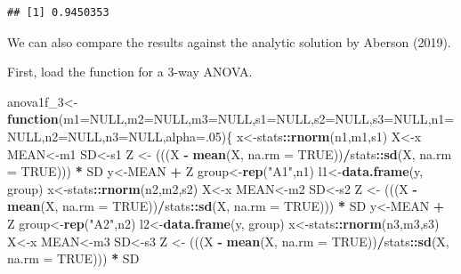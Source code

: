 \documentclass[]{book}
\newenvironment{Shaded}{\begin{snugshade}}{\end{snugshade}}
\newcommand{\ControlFlowTok}[1]{\textcolor[rgb]{0.13,0.29,0.53}{\textbf{#1}}}
\newcommand{\DataTypeTok}[1]{\textcolor[rgb]{0.13,0.29,0.53}{#1}}
\newcommand{\DecValTok}[1]{\textcolor[rgb]{0.00,0.00,0.81}{#1}}
\newcommand{\KeywordTok}[1]{\textcolor[rgb]{0.13,0.29,0.53}{\textbf{#1}}}
\newcommand{\NormalTok}[1]{#1}
\newcommand{\OperatorTok}[1]{\textcolor[rgb]{0.81,0.36,0.00}{\textbf{#1}}}
\newcommand{\OtherTok}[1]{\textcolor[rgb]{0.56,0.35,0.01}{#1}}
\newcommand{\StringTok}[1]{\textcolor[rgb]{0.31,0.60,0.02}{#1}}
\begin{document}
\begin{verbatim}
## [1] 0.9450353
\end{verbatim}

We can also compare the results against the analytic solution by Aberson (2019).

First, load the function for a 3-way ANOVA.

\begin{Shaded}
\begin{Highlighting}[]
\NormalTok{anova1f_}\DecValTok{3}\NormalTok{<-}\ControlFlowTok{function}\NormalTok{(}\DataTypeTok{m1=}\OtherTok{NULL}\NormalTok{,}\DataTypeTok{m2=}\OtherTok{NULL}\NormalTok{,}\DataTypeTok{m3=}\OtherTok{NULL}\NormalTok{,}\DataTypeTok{s1=}\OtherTok{NULL}\NormalTok{,}\DataTypeTok{s2=}\OtherTok{NULL}\NormalTok{,}\DataTypeTok{s3=}\OtherTok{NULL}\NormalTok{,}\DataTypeTok{n1=}\OtherTok{NULL}\NormalTok{,}\DataTypeTok{n2=}\OtherTok{NULL}\NormalTok{,}\DataTypeTok{n3=}\OtherTok{NULL}\NormalTok{,}\DataTypeTok{alpha=}\NormalTok{.}\DecValTok{05}\NormalTok{)\{}
\NormalTok{x<-stats}\OperatorTok{::}\KeywordTok{rnorm}\NormalTok{(n1,m1,s1)}
\NormalTok{X<-x}
\NormalTok{MEAN<-m1}
\NormalTok{SD<-s1}
\NormalTok{Z <-}\StringTok{ }\NormalTok{(((X }\OperatorTok{-}\StringTok{ }\KeywordTok{mean}\NormalTok{(X, }\DataTypeTok{na.rm =} \OtherTok{TRUE}\NormalTok{))}\OperatorTok{/}\NormalTok{stats}\OperatorTok{::}\KeywordTok{sd}\NormalTok{(X, }\DataTypeTok{na.rm =} \OtherTok{TRUE}\NormalTok{))) }\OperatorTok{*}\StringTok{ }\NormalTok{SD}
\NormalTok{y<-MEAN }\OperatorTok{+}\StringTok{ }\NormalTok{Z}
\NormalTok{group<-}\KeywordTok{rep}\NormalTok{(}\StringTok{"A1"}\NormalTok{,n1)}
\NormalTok{l1<-}\KeywordTok{data.frame}\NormalTok{(y, group)}
\NormalTok{x<-stats}\OperatorTok{::}\KeywordTok{rnorm}\NormalTok{(n2,m2,s2)}
\NormalTok{X<-x}
\NormalTok{MEAN<-m2}
\NormalTok{SD<-s2}
\NormalTok{Z <-}\StringTok{ }\NormalTok{(((X }\OperatorTok{-}\StringTok{ }\KeywordTok{mean}\NormalTok{(X, }\DataTypeTok{na.rm =} \OtherTok{TRUE}\NormalTok{))}\OperatorTok{/}\NormalTok{stats}\OperatorTok{::}\KeywordTok{sd}\NormalTok{(X, }\DataTypeTok{na.rm =} \OtherTok{TRUE}\NormalTok{))) }\OperatorTok{*}\StringTok{ }\NormalTok{SD}
\NormalTok{y<-MEAN }\OperatorTok{+}\StringTok{ }\NormalTok{Z}
\NormalTok{group<-}\KeywordTok{rep}\NormalTok{(}\StringTok{"A2"}\NormalTok{,n2)}
\NormalTok{l2<-}\KeywordTok{data.frame}\NormalTok{(y, group)}
\NormalTok{x<-stats}\OperatorTok{::}\KeywordTok{rnorm}\NormalTok{(n3,m3,s3)}
\NormalTok{X<-x}
\NormalTok{MEAN<-m3}
\NormalTok{SD<-s3}
\NormalTok{Z <-}\StringTok{ }\NormalTok{(((X }\OperatorTok{-}\StringTok{ }\KeywordTok{mean}\NormalTok{(X, }\DataTypeTok{na.rm =} \OtherTok{TRUE}\NormalTok{))}\OperatorTok{/}\NormalTok{stats}\OperatorTok{::}\KeywordTok{sd}\NormalTok{(X, }\DataTypeTok{na.rm =} \OtherTok{TRUE}\NormalTok{))) }\OperatorTok{*}\StringTok{ }\NormalTok{SD}

\end{Highlighting}
\end{Shaded}
\end{document}

